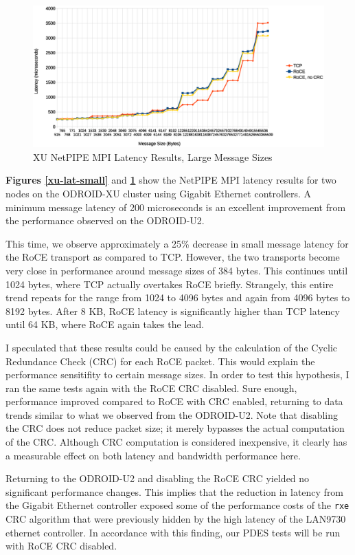 \documentclass[11pt]{book}
\begin{document}
\begin{figure}[h]
\includegraphics[width=\textwidth]{xu_lat_large}
\caption{XU NetPIPE MPI Latency Results, Large Message Sizes}
\label{xu-lat-large}
\end{figure}

\textbf{Figures \ref{xu-lat-small}} and \textbf{\ref{xu-lat-large}} show the
NetPIPE MPI latency results for two nodes on the ODROID-XU cluster using Gigabit
Ethernet controllers. A minimum message latency of 200 microseconds is an
excellent improvement from the performance observed on the ODROID-U2.

This time, we observe approximately a 25\% decrease in small message latency for
the RoCE transport as compared to TCP. However, the two transports become very
close in performance around message sizes of 384 bytes. This continues until
1024 bytes, where TCP actually overtakes RoCE briefly. Strangely, this entire
trend repeats for the range from 1024 to 4096 bytes and again from 4096 bytes to
8192 bytes. After 8 KB, RoCE latency is significantly higher than TCP latency
until 64 KB, where RoCE again takes the lead.

I speculated that these results could be caused by the calculation of the Cyclic
Redundance Check (CRC) for each RoCE packet. This would explain the performance
sensitifity to certain message sizes. In order to test this hypothesis, I ran
the same tests again with the RoCE CRC disabled. Sure enough, performance
improved compared to RoCE with CRC enabled, returning to data trends similar to
what we observed from the ODROID-U2. Note that disabling the CRC does not reduce
packet size; it merely bypasses the actual computation of the CRC. Although CRC
computation is considered inexpensive, it clearly has a measurable effect on
both latency and bandwidth performance here.

Returning to the ODROID-U2 and disabling the RoCE CRC yielded no significant
performance changes. This implies that the reduction in latency from the Gigabit
Ethernet controller exposed some of the performance costs of the \verb;rxe; CRC
algorithm that were previously hidden by the high latency of the LAN9730
ethernet controller. In accordance with this finding, our PDES tests will be run
with RoCE CRC disabled.
\end{document}
